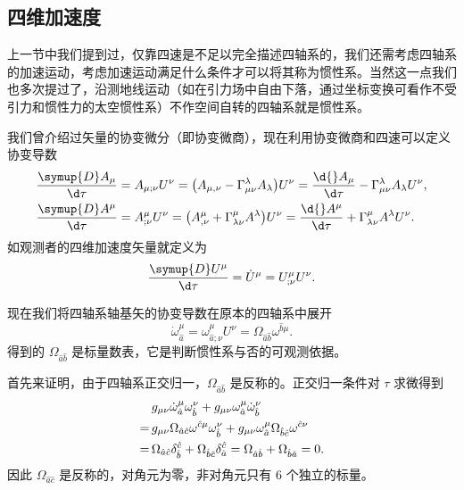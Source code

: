 \documentclass[UTF8, 12pt, a4paper, oneside, onecolumn, fontset=none]{ctexart}
\begin{document}
\subsection{四维加速度}
上一节中我们提到过，仅靠四速是不足以完全描述四轴系的，我们还需考虑四轴系的加速运动，考虑加速运动满足什么条件才可以将其称为惯性系。当然这一点我们也多次提过了，沿测地线运动（如在引力场中自由下落，通过坐标变换可看作不受引力和惯性力的太空惯性系）不作空间自转的四轴系就是惯性系。

我们曾介绍过矢量的协变微分（即协变微商），现在利用协变微商和四速可以定义协变导数
\begin{align}
\frac{\symup{D}A_{\mu}}{\d\tau}&=A_{\mu;\nu}U^{\nu}=\mleft(A_{\mu,\nu}-\Gamma_{\mu\nu}^{\lambda}A_{\lambda}\mright) U^{\nu}=\frac{\d{}A_{\mu}}{\d\tau}-\Gamma^{\lambda}_{\mu\nu}A_{\lambda}U^{\nu},\\
\frac{\symup{D}A^{\mu}}{\d\tau}&=A^{\mu}_{;\nu}U^{\nu}=\mleft(A^{\mu}_{,\nu}+\Gamma^{\mu}_{\lambda\nu}A^{\lambda}\mright) U^{\nu}=\frac{\d{}A^{\mu}}{\d\tau}+\Gamma^{\mu}_{\lambda\nu}A^{\lambda}U^{\nu}.
\end{align}
如观测者的四维加速度矢量就定义为
\begin{equation}
\dfrac{\symup{D}U^{\mu}}{\d\tau}=\dot{U}^{\mu}=U^{\mu}_{;\nu}U^{\nu}.
\end{equation}

现在我们将四轴系轴基矢的协变导数在原本的四轴系中展开
\begin{equation}
\dot{\omega}^{\mu}_{\hat{a}}=\omega^{\mu}_{\hat{a};\nu}U^{\nu}=\Omega_{\hat{a}\hat{b}}\omega^{\hat{b}\mu}.
\end{equation}
得到的 $\Omega_{\hat{a}\hat{b}}$ 是标量数表，它是判断惯性系与否的可观测依据。

首先来证明，由于四轴系正交归一，$\Omega_{\hat{a}\hat{b}}$ 是反称的。正交归一条件对 $\tau$ 求微得到
\begin{align}
&g_{\mu\nu}\dot{\omega}^{\mu}_{\hat{a}}\omega^{\nu}_{\hat{b}}+g_{\mu\nu}\omega^{\mu}_{\hat{a}}\dot{\omega}^{\nu}_{\hat{b}}\notag\\
=\,&g_{\mu\nu}\Omega_{\hat{a}\hat{c}}\omega^{\hat{c}\mu}\omega^{\nu}_{\hat{b}}+g_{\mu\nu}\omega^{\mu}_{\hat{a}}\Omega_{\hat{b}\hat{c}}\omega^{\hat{c}\nu}\notag\\
=\,&\Omega_{\hat{a}\hat{c}}\delta^{\hat{c}}_{\hat{b}}+\Omega_{\hat{b}\hat{c}}\delta^{\hat{c}}_{\hat{a}}=\Omega_{\hat{a}\hat{b}}+\Omega_{\hat{b}\hat{a}}=0.
\end{align}
因此 $\Omega_{\hat{a}\hat{c}}$ 是反称的，对角元为零，非对角元只有 6 个独立的标量。
\end{document}
